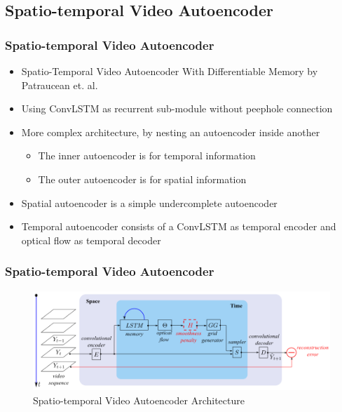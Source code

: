  \subsection{Spatio-temporal Video Autoencoder}
  \begin{frame}
   \frametitle{Spatio-temporal Video Autoencoder}
   
   \begin{itemize}
    \item<1-> \glqq Spatio-Temporal Video Autoencoder With Differentiable Memory \grqq by Patraucean et. al. \cite{Patraucean2015}
    \item<2-> Using ConvLSTM as recurrent sub-module without peephole connection
    \item<3-> More complex architecture, by nesting an autoencoder inside another
    \begin{itemize}
     \item<4-> The inner autoencoder is for temporal information
     \item<5-> The outer autoencoder is for spatial information
    \end{itemize}
    \item<6-> Spatial autoencoder is a simple undercomplete autoencoder
    \item<7-> Temporal autoencoder consists of a ConvLSTM as temporal encoder and optical flow as temporal decoder
   \end{itemize}
   
  \end{frame}
  \begin{frame}
   \frametitle{Spatio-temporal Video Autoencoder}
   
   \begin{figure}[H]
    \includegraphics[width=1.0\textwidth]{../Images/patraucean.png}
    \centering
    \caption{Spatio-temporal Video Autoencoder Architecture \citep{Patraucean2015}}
    \label{fig:spatiotemp_architecture}
   \end{figure}
   
  \end{frame}
